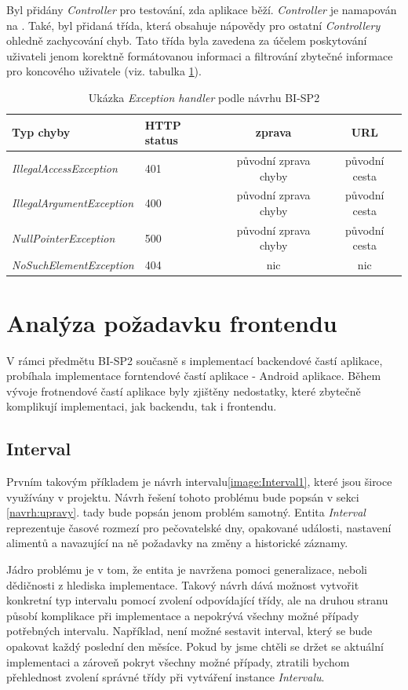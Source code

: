         Byl přidány \textit{Controller} pro testování, zda aplikace běží. \textit{Controller} je namapován na \textquote{/}. Také, byl přidaná třída, která obsahuje nápovědy pro ostatní \textit{Controllery} ohledně zachycování chyb. Tato třída byla zavedena za účelem poskytování uživateli jenom korektně formátovanou informaci  a filtrování zbytečné informace pro koncového uživatele (viz. tabulka \ref{tab:excpetion-handler1}). 
        \begin{table}\centering
	    \caption[Exception handler]{Ukázka \textit{Exception handler} podle návrhu BI-SP2}\label{tab:excpetion-handler1}
	        \begin{tabular}{|l|l|c|c|}\hline
		        Typ chyby		& HTTP status		& zprava	& URL	\tabularnewline \hline \hline
		        \textit{IllegalAccessException}	& 401	& původní zprava chyby		& původní cesta     \tabularnewline \hline
		        \textit{IllegalArgumentException}	& 400	& původní zprava chyby		& původní cesta     \tabularnewline \hline
		        \textit{NullPointerException}	& 500	& původní zprava chyby		& původní cesta     \tabularnewline \hline
		        \textit{NoSuchElementException}	& 404	& nic		& nic     \tabularnewline \hline
	        \end{tabular}
        \end{table}
    
    \section{Analýza požadavku frontendu}
        V rámci předmětu BI-SP2 současně s implementací backendové častí aplikace, probíhala implementace forntendové častí aplikace - Android aplikace. Během vývoje frotnendové častí aplikace byly zjištěny nedostatky, které zbytečně komplikují implementaci, jak backendu, tak i frontendu.
        \subsection{Interval}
            Prvním takovým příkladem je návrh intervalu\ref{image:Interval1}, které jsou široce využívány v projektu. Návrh řešení tohoto problému bude popsán v sekci \ref{navrh:upravy}. tady bude popsán jenom problém samotný. Entita \textit{Interval} reprezentuje časové rozmezí pro pečovatelské dny, opakované události, nastavení alimentů a navazující na ně požadavky na změny a historické záznamy.
            
            Jádro problému je v tom, že entita je navržena pomoci generalizace, neboli dědičnosti z hlediska implementace. Takový návrh dává možnost vytvořit konkretní typ intervalu pomocí zvolení odpovídající třídy, ale na druhou stranu působí komplikace při implementace a nepokrývá všechny možné případy potřebných intervalu. Například, není možné sestavit interval, který se bude opakovat každý poslední den měsíce. Pokud by jsme chtěli se držet se aktuální implementaci a zároveň pokryt všechny možné případy, ztratili bychom přehlednost zvolení správné třídy při vytváření instance \textit{Intervalu}.
            
